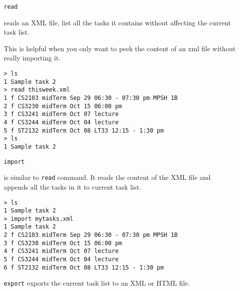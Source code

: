 \documentclass[12pt, a4paper]{article}
\begin{document}
\begin{enumerate}
\item [ \texttt{read} ]

  reads an XML file, list all the tasks it contains without affecting the current task list.

This is helpful when you only want to peek the content of an xml file without really importing it.

\texttt{\textgreater \ ls\\
    1   Sample task 2\\
    \textgreater \ read thisweek.xml \footnotemark \\
    1 f CS2103 midTerm Sep 29 06:30 - 07:30 pm MPSH 1B\\
    2 f CS3230 midTerm Oct 15 06:00 pm\\
    3 f CS3241 midTerm Oct 07 lecture\\
    4 f CS3244 midTerm Oct 04 lecture\\
    5 f ST2132 midTerm Oct 08 LT33 12:15 - 1:30 pm\\
    \textgreater \ ls\\
    1   Sample task 2}


\item [ \texttt{import} ]

  is similar to \texttt{read} command. It reads the content of the XML file and appends all the tasks in it to current task list.

\texttt{\textgreater \ ls\\
    1   Sample task 2\\
    \textgreater \ import mytasks.xml\\
    1   Sample task 2 \footnotemark\\
    2 f CS2103 midTerm Sep 29 06:30 - 07:30 pm MPSH 1B\\
    3 f CS3230 midTerm Oct 15 06:00 pm\\
    4 f CS3241 midTerm Oct 07 lecture\\
    5 f CS3244 midTerm Oct 04 lecture\\
    6 f ST2132 midTerm Oct 08 LT33 12:15 - 1:30 pm}


\item [ \texttt{export} ]
  exports the current task list to an XML or HTML file.


\end{enumerate}
\end{document}
